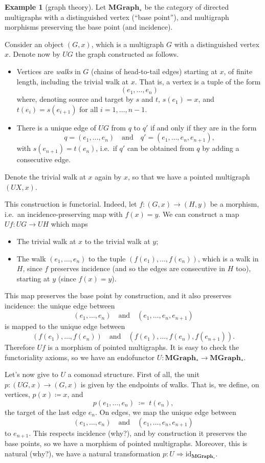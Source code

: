 \documentclass[12pt,oneside,headings=small]{scrbook}
\numberwithin{equation}{section}
\theoremstyle{plain}
\theoremstyle{definition}
\newtheorem{eg}[thm]{Example}
\newcommand{\cat}[1]{{\mathbf{#1}}} %
\DeclareMathOperator{\1}{\mathbbm{1}}
\DeclareMathOperator{\2}{\mathbbm{2}}
\newcommand{\id}{\mathrm{id}} %
\begin{document}
\begin{eg}[graph theory]\label{ucgraphs}
 Let $\cat{MGraph}_*$ be the category of directed multigraphs with a distinguished vertex (``base point''), and multigraph morphisms preserving the base point (and incidence). 
 
 Consider an object $(G,x)$, which is a multigraph $G$ with a distinguished vertex $x$. Denote now by $UG$ the graph constructed as follows.
 \begin{itemize}
  \item Vertices are \emph{walks} in $G$ (chains of head-to-tail edges) starting at $x$, of finite length, including the trivial walk at $x$. That is, a vertex is a tuple of the form
  $$
  (e_1,\dots,e_n)
  $$
  where, denoting source and target by $s$ and $t$, $s(e_1)=x$, and $t(e_i)=s(e_{i+1})$ for all $i=1,\dots,n-1$.
  \item There is a unique edge of $UG$ from $q$ to $q'$ if and only if they are in the form 
  $$
  q=(e_1,\dots,e_n) \quad\mbox{and}\quad q'=(e_1,\dots,e_n,e_{n+1}) ,
  $$
  with $s(e_{n+1})=t(e_n)$,
  i.e.~if $q'$ can be obtained from $q$ by adding a consecutive edge. 
 \end{itemize}
 Denote the trivial walk at $x$ again by $x$, so that we have a pointed multigraph $(UX,x)$. 
 
 This construction is functorial. Indeed, let $f:(G,x)\to (H,y)$ be a morphism, i.e.~an incidence-preserving map with $f(x)=y$. We can construct a map $Uf:UG\to UH$ which maps 
 \begin{itemize}
  \item The trivial walk at $x$ to the trivial walk at $y$;
  \item The walk $(e_1,\dots,e_n)$ to the tuple $(f(e_1),\dots,f(e_n))$, which is a walk in $H$, since $f$ preserves incidence (and so the edges are consecutive in $H$ too), starting at $y$ (since $f(x)=y$). 
 \end{itemize}
 This map preserves the base point by construction, and it also preserves incidence: the unique edge between
 $$
 (e_1,\dots,e_n) \quad\mbox{and}\quad (e_1,\dots,e_n,e_{n+1})
 $$
 is mapped to the unique edge between
 $$
 (f(e_1),\dots,f(e_n)) \quad\mbox{and}\quad (f(e_1),\dots,f(e_n),f(e_{n+1})) .
 $$
 Therefore $Uf$ is a morphism of pointed multigraphs.
 It is easy to check the functoriality axioms, so we have an endofunctor $U:\cat{MGraph}_*\to\cat{MGraph}_*$. 

 Let's now give to $U$ a comonad structure. First of all, the unit $p:(UG,x)\to(G,x)$ is given by the endpoints of walks. That is, we define, on vertices, $p(x)\coloneqq x$, and
 $$
 p(e_1,\dots,e_n) \;\coloneqq\; t(e_n),
 $$
 the target of the last edge $e_n$. On edges, we map the unique edge between
 $$
 (e_1,\dots,e_n) \quad\mbox{and}\quad (e_1,\dots,e_n,e_{n+1})
 $$
 to $e_{n+1}$. This respects incidence (why?), and by construction it preserves the base points, so we have a morphism of pointed multigraphs. Moreover, this is natural (why?), we have a natural transformation $p:U\Rightarrow \id_{\cat{MGraph}_*}$. 
 

\end{eg}
\end{document}
